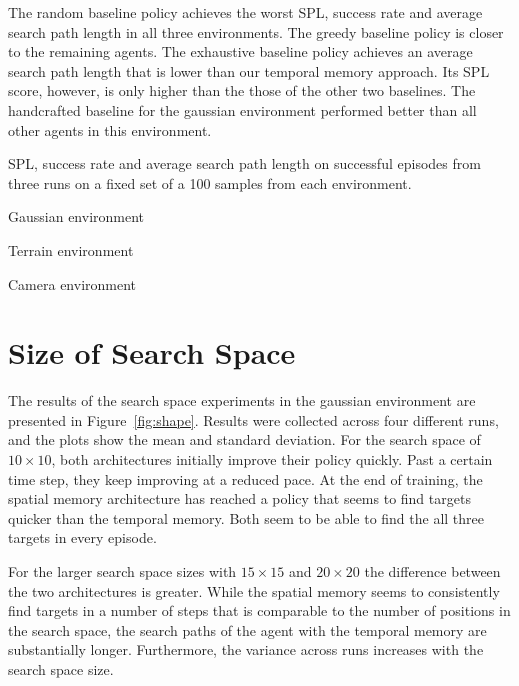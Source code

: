 The random baseline policy achieves the worst SPL, success rate and average search path length in all three environments.
The greedy baseline policy is closer to the remaining agents.
The exhaustive baseline policy achieves an average search path length that is lower than our temporal memory approach.
Its SPL score, however, is only higher than the those of the other two baselines.
The handcrafted baseline for the gaussian environment performed better than all other agents in this environment. %

\begin{table}
    \centering
    \label{tab:metrics}
    \caption[Performance metrics for each environment.]{SPL, success rate and average search path length on successful episodes from three runs on a fixed set of a 100 samples from each environment.}
    Gaussian environment\par\vspace{0.5em}
    
    \par\vspace{1em}Terrain environment\par\vspace{0.5em}
    
    \par\vspace{1em}Camera environment\par\vspace{0.5em}
    
\end{table}

\section{Size of Search Space}
\label{sec:shape}

The results of the search space experiments in the gaussian environment are presented in Figure~\ref{fig:shape}.
Results were collected across four different runs, and the plots show the mean and standard deviation.
For the search space of \(10 \times 10\), both architectures initially improve their policy quickly.
Past a certain time step, they keep improving at a reduced pace.
At the end of training, the spatial memory architecture has reached a policy that seems to find targets quicker than the temporal memory.
Both seem to be able to find the all three targets in every episode.

For the larger search space sizes with \(15 \times 15\) and \(20 \times 20\) the difference between the two architectures is greater.
While the spatial memory seems to consistently find targets in a number of steps that is comparable to the number of positions in the search space,
the search paths of the agent with the temporal memory are substantially longer.
Furthermore, the variance across runs increases with the search space size.

